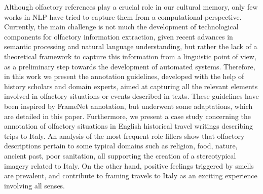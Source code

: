 Although olfactory references play a crucial role in our cultural memory, only few works in NLP have tried to capture them from a computational perspective. Currently, the main challenge is not much the development of technological components for olfactory information extraction, given recent advances in semantic processing and natural language understanding, but rather the lack of a theoretical framework to capture this information from a linguistic point of view, as a preliminary step towards the development of automated systems. Therefore, in this work we present the annotation guidelines, developed with the help of history scholars and domain experts, aimed at capturing all the relevant elements involved in olfactory situations or events  described in texts. These guidelines have been inspired by FrameNet annotation, but underwent some adaptations, which are detailed in this paper. Furthermore, we present a case study concerning the annotation of olfactory situations in English historical travel writings describing trips to Italy. An analysis of the most frequent role fillers show that olfactory descriptions pertain to some typical domains such as religion, food, nature, ancient past, poor sanitation, all supporting the creation of a stereotypical imagery related to Italy. On the other hand, positive feelings triggered by smells  are prevalent, and contribute to framing travels to Italy as an exciting experience involving all senses.
